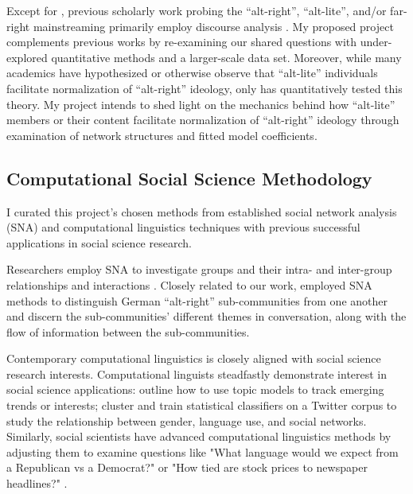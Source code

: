 \documentclass[acmlarge, screen, authorversion]{acmart}
\begin{document}
Except for \citet{ribeiroAuditingRadicalizationPathways2019}, previous scholarly work probing the
“alt-right”, “alt-lite”, and/or far-right mainstreaming
primarily employ discourse analysis \cite{cammaertsMainstreamingExtremeRightWing2018, gallaherMainstreamingWhiteSupremacy2020, lorenzo-dusDiscourseUSAltright2020, fergusWhitegenocideAltrightConspiracy2019}. My proposed project
complements previous works by re-examining our shared questions with
under-explored quantitative methods and a larger-scale data set. Moreover,
while many academics \cite{sternProudBoysWhite2019, nagleKillAllNormies2017, mainRiseAltRight2018} have hypothesized or otherwise observe that “alt-lite”
individuals facilitate normalization of “alt-right” ideology, only
\citet{ribeiroAuditingRadicalizationPathways2019} has quantitatively tested this theory. My
project intends to shed light on the mechanics behind how “alt-lite” members or their
content facilitate normalization of “alt-right” ideology through
examination of network structures and fitted model coefficients.

\subsection{Computational Social Science Methodology}

I curated this project's chosen methods from established social network analysis (SNA) and computational linguistics techniques with previous successful applications in social science research. 

Researchers employ SNA to investigate groups and their intra- and inter-group relationships and interactions \cite{carringtonModelsMethodsSocial2005}. Closely related to our work, \citet{morstatterAltRightAltRechtsTwitter2018} employed SNA methods to distinguish German ``alt-right'' sub-communities from one another and discern the sub-communities' different themes in conversation, along with the flow of information between the sub-communities.

Contemporary computational linguistics is closely aligned with social science research interests. Computational linguists steadfastly demonstrate interest in social science applications: \citep{lauOnlineTrendAnalysis} outline how to use topic models to track emerging trends or interests; \cite{bammanGenderIdentityLexical2014} cluster and train statistical classifiers on a Twitter corpus to study the relationship between gender, language use, and social networks. Similarly, social scientists have advanced computational linguistics methods by adjusting them to examine questions like "What language would we expect from a Republican vs a Democrat?" or "How tied are stock prices to newspaper headlines?"  \cite{monroeFightinWordsLexical2008, gentzkowTextData2019}. 
\end{document}
